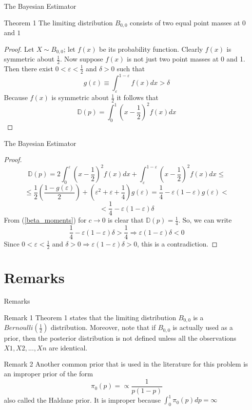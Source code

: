 \documentclass{beamer}
\begin{document}
\begin{frame}{The Bayesian Estimator}
    \begin{block}{Theorem 1}
        The limiting distribution $B_{0,0}$ consists of two equal point masses at $0$ and $1$
    \end{block}
    
    \begin{proof}
        Let $X \sim B_{0, 0}$; let $f(x)$ be its probability function. Clearly $f(x)$ is symmetric about $\frac{1}{2}$.  Now suppose $f(x)$ is not just two point masses at 0 and 1. Then there exist $0 < \varepsilon < \frac{1}{2}$ and $\delta > 0$ such that
        \[g(\varepsilon) \equiv \int_{\varepsilon}^{1-\varepsilon}f(x) dx > \delta\]
        Because $f(x)$ is symmetric about $\frac{1}{2}$ it follows that
        \[\mathbb{D}(p) = \int_{0}^{1}\left(x - \frac{1}{2}\right)^2 f(x)dx\] 
    \end{proof}
\end{frame}

\begin{frame}{The Bayesian Estimator}
    \begin{proof}
        \[\mathbb{D}(p) = 2\int_{0}^{\varepsilon}\left(x - \frac{1}{2}\right)^2 f(x)dx + \int_{\varepsilon}^{1-\varepsilon}\left(x - \frac{1}{2}\right)^2 f(x) dx \leqslant \]
        \[\leqslant \dfrac{1}{2}\left(\dfrac{1 - g(\varepsilon)}{2}\right) + \left(\varepsilon^2 + \varepsilon + \dfrac{1}{4}\right)g(\varepsilon) = \dfrac{1}{4} - \varepsilon(1 - \varepsilon)g(\varepsilon) < \]
        \[< \dfrac{1}{4} - \varepsilon(1 - \varepsilon)\delta\]
    From (\ref{beta_moments}) for $c \to 0$ is clear that $\mathbb{D}(p) = \frac{1}{4}$. So, we can write
    \[\dfrac{1}{4} - \varepsilon(1 - \varepsilon)\delta > \dfrac{1}{4} \Rightarrow \varepsilon(1 - \varepsilon)\delta < 0\]
    Since $0 < \varepsilon < \frac{1}{2}$ and $\delta > 0 \Rightarrow \varepsilon(1 - \varepsilon)\delta > 0$, this is a contradiction.
    \end{proof}
\end{frame}

\section{Remarks}
\begin{frame}{Remarks}
    \begin{block}{Remark 1}
        Theorem 1 states that the limiting distribution $B_{0, 0}$ is a $Bernoulli(\frac{1}{2})$ distribution. Moreover, note that if $B_{0,0}$ is actually used as a prior, then the posterior distribution is not defined unless all the
        observations $X1, X2, ..., Xn$ are identical.
    \end{block}
    
    \begin{block}{Remark 2}
        Another common prior that is used in the literature for this problem is an improper prior of the form 
        \[\pi_0(p) = \propto \dfrac{1}{p(1-p)}\]
        also called the Haldane prior. It is improper because $\int_{0}^1 \pi_0(p)dp = \infty$
    \end{block}
\end{frame}
\end{document}
